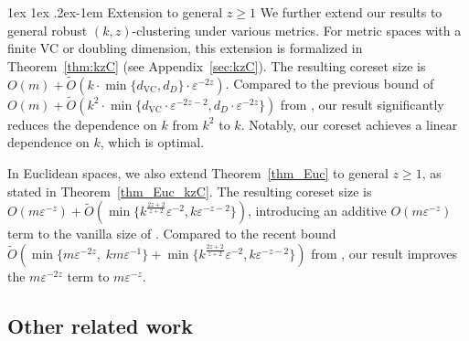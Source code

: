 \documentclass[11pt,letterpaper]{article}
\makeatletter
\renewcommand{\paragraph}{%
  \@startsection{paragraph}{4}%
  {\z@}{1ex \@plus 1ex \@minus .2ex}{-1em}%
  {\normalfont\normalsize\bfseries}%
}
\theoremstyle{definition}
\newcommand{\eps}{\varepsilon}
\newcommand{\VC}{\ensuremath{\mathrm{VC}}}
\newcommand{\ZJ}[1]{\textcolor{green}{ZJ:#1}}
\makeatother
\begin{document}
\paragraph{Extension to general $z\geq 1$}
We further extend our results to general robust \((k,z)\)-clustering under various metrics.
%
For metric spaces with a finite VC or doubling dimension, this extension is formalized in Theorem~\ref{thm:kzC} (see Appendix~\ref{sec:kzC}).
%
The resulting coreset size is \( O(m) + \tilde{O}(k \cdot \min\{d_{\VC}, d_D\} \cdot \eps^{-2z}) \).  
%
Compared to the previous bound of \( O(m) + \tilde{O}(k^2 \cdot \min\{ d_{\VC} \cdot \eps^{-2z-2}, d_D \cdot \eps^{-2z} \}) \) from \cite{huang2025coresets}, our result significantly reduces the dependence on \( k \) from \( k^2 \) to \( k \).  
%
Notably, our coreset achieves a linear dependence on \( k \), which is optimal.
%

In Euclidean spaces, we also extend Theorem~\ref{thm_Euc} to general \( z \geq 1 \), as stated in Theorem~\ref{thm_Euc_kzC}. %
%
The resulting coreset size is \( O(m \eps^{-z}) + \tilde{O}(\min\{k^{\frac{2z+2}{z+2}} \eps^{-2}, k \eps^{-z-2}\}) \), introducing an additive \( O(m \eps^{-z}) \) term to the vanilla size of \cite{huang2024optimal}.  
%
Compared to the recent bound \( \tilde{O}(\min\{m \eps^{-2z},\; km \eps^{-1}\} + \min\{k^{\frac{2z+2}{z+2}} \eps^{-2}, k \eps^{-z-2}\}) \) from \cite{jiang2025coresets}, our result improves the \( m \eps^{-2z} \) term to \( m \eps^{-z} \).


\subsection{Other related work}
\label{sec:related}
\end{document}
